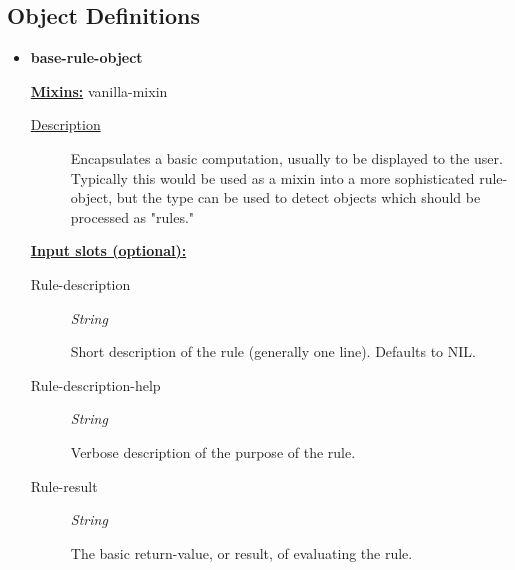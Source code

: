 \documentclass [11pt]{book}
\begin{document}
\subsection{Object Definitions}

\label{subsec:objectdefinitions}



\begin{itemize}

\item {}
\label{prim:base-rule-object}
\textbf{base-rule-object}


\textbf{
\underline{Mixins:}} vanilla-mixin





\begin{description}

\item [
\underline{Description}]


Encapsulates a basic computation, usually to be displayed to the user.
Typically this would be used as a mixin into a more sophisticated rule-object, but the type can be
 used to detect objects which should be processed as "rules."



\end{description}








\textbf{
\underline{Input slots (optional):}}

\begin{description}

\item [Rule-description]
\emph{String}

 Short description of the rule (generally one line). Defaults to NIL.




\item [Rule-description-help]
\emph{String}

 Verbose description of the purpose of the rule.




\item [Rule-result]
\emph{String}

 The basic return-value, or result, of evaluating the rule.





\end{description}
\end{itemize}
\end{document}
